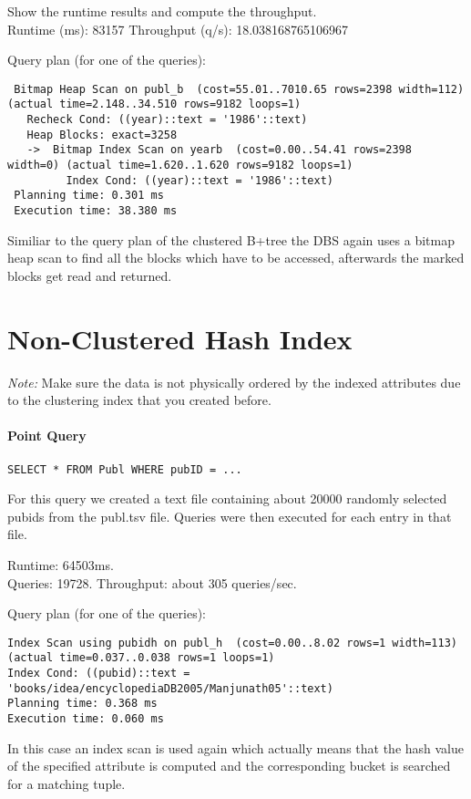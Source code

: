 \documentclass[11pt]{scrartcl}
\begin{document}
\smallskip\noindent
Show the runtime results and compute the throughput.\\
Runtime (ms): 83157
Throughput (q/s): 18.038168765106967

\smallskip\noindent
Query plan (for one of the queries):
{\small
\begin{verbatim}
 Bitmap Heap Scan on publ_b  (cost=55.01..7010.65 rows=2398 width=112) (actual time=2.148..34.510 rows=9182 loops=1)
   Recheck Cond: ((year)::text = '1986'::text)
   Heap Blocks: exact=3258
   ->  Bitmap Index Scan on yearb  (cost=0.00..54.41 rows=2398 width=0) (actual time=1.620..1.620 rows=9182 loops=1)
         Index Cond: ((year)::text = '1986'::text)
 Planning time: 0.301 ms
 Execution time: 38.380 ms
\end{verbatim}
}
Similiar to the query plan of the clustered B+tree the DBS again uses a bitmap heap scan to find all the blocks which have to be accessed, afterwards the marked blocks get read and returned.

\section{Non-Clustered Hash Index}

\noindent \emph{Note:} Make sure the data is not physically ordered by
the indexed attributes due to the clustering index that you created
before.

\paragraph{Point Query}

{\small
\begin{verbatim}
SELECT * FROM Publ WHERE pubID = ...
\end{verbatim}
}

\noindent
For this query we created a text file containing about 20000 randomly selected pubids from the publ.tsv file. Queries were then executed for each entry in that file.

\smallskip\noindent
Runtime: 64503ms. \\
Queries: 19728.
Throughput: about 305 queries/sec.

\smallskip\noindent
Query plan (for one of the queries):
{\small
\begin{verbatim}
Index Scan using pubidh on publ_h  (cost=0.00..8.02 rows=1 width=113) (actual time=0.037..0.038 rows=1 loops=1)
Index Cond: ((pubid)::text = 'books/idea/encyclopediaDB2005/Manjunath05'::text)
Planning time: 0.368 ms
Execution time: 0.060 ms
\end{verbatim}
In this case an index scan is used again which actually means that the hash value of the specified attribute is computed
and the corresponding bucket is searched for a matching tuple.
}
\end{document}
